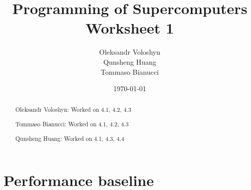 \documentclass{article}
\title{Programming of Supercomputers\\Worksheet 1}
\author{Oleksandr Voloshyn\\ Qunsheng Huang\\ Tommaso Bianucci}
\date{\today}
\begin{document}
\maketitle
\renewcommand{\abstractname}{Group members's contributions}
\begin{abstract}
	Oleksandr Voloshyn: Worked on 4.1, 4.2, 4.3

	Tommaso Bianucci: Worked on 4.1, 4.2, 4.3
	
	Qunsheng Huang: Worked on 4.1, 4.3, 4.4
\end{abstract}

\section{Performance baseline} %
\end{document}
